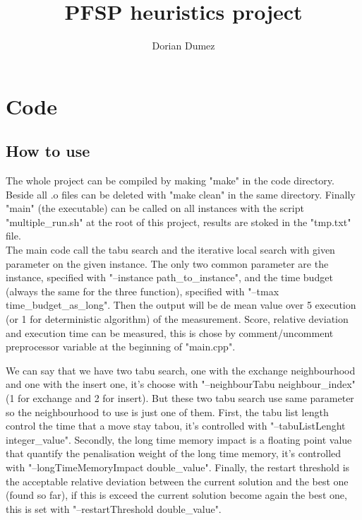 \documentclass[12pt,a4paper]{article}
\title{PFSP heuristics project}
\author{Dorian Dumez}
\begin{document}
\maketitle

\section{Code}

\subsection{How to use}

The whole project can be compiled by making "make" in the code directory. Beside all .o files can be deleted with "make clean" in the same directory. Finally "main" (the executable) can be called on all instances with the script "multiple\_run.sh" at the root of this project, results are stoked in the "tmp.txt" file.\\

The main code call the tabu search and the iterative local search with given parameter on the given instance. The only two common parameter are the instance, specified with "--instance path\_to\_instance", and the time budget (always the same for the three function), specified with "--tmax time\_budget\_as\_long". Then the output will be de mean value over 5 execution (or 1 for deterministic algorithm) of the measurement. Score, relative deviation and execution time can be measured, this is chose by comment/uncomment preprocessor variable at the beginning of "main.cpp".

We can say that we have two tabu search, one with the exchange neighbourhood and one with the insert one, it's choose with  "--neighbourTabu neighbour\_index" (1 for exchange and 2 for insert). But these two tabu search use same parameter so the neighbourhood to use is just one of them. First, the tabu list length control the time that a move stay tabou, it's controlled with "--tabuListLenght integer\_value". Secondly, the long time memory impact is a floating point value that quantify the penalisation weight of the long time memory, it's controlled with "--longTimeMemoryImpact double\_value". Finally, the restart threshold is the acceptable relative deviation between the current solution and the best one (found so far), if this is exceed the current solution become again the best one, this is set with "--restartThreshold double\_value".
\end{document}
